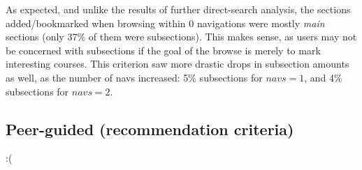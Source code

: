   As expected, and unlike the results of further direct-search analysis, the sections added/bookmarked when browsing within 0 navigations were mostly \emph{main} sections (only 37\% of them were subsections). This makes sense, as users may not be concerned with subsections if the goal of the browse is merely to mark interesting courses. This criterion saw more drastic drops in subsection amounts as well, as the number of navs increased: 5\% subsections for ${navs}=1$, and 4\% subsections for ${navs}=2$.

\subsection{Peer-guided (recommendation criteria)}

  :(